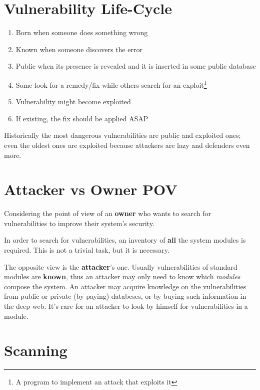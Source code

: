 \section{Vulnerability Life-Cycle}
\begin{enumerate}
    \item Born when someone does something wrong
    \item Known when someone discovers the error
    \item Public when its presence is revealed and it is inserted in some public database
    \item Some look for a remedy/fix while others search for an exploit\footnote{A program to implement an attack that exploits it}
    \item Vulnerability might become exploited
    \item If existing, the fix should be applied ASAP
\end{enumerate}

Historically the most dangerous vulnerabilities are public and exploited ones;
even the oldest ones are exploited because attackers are lazy and defenders even more.

\section{Attacker vs Owner POV}
Considering the point of view of an \textbf{owner} who wants to search for vulnerabilities to improve their system's security.\nl

In order to search for vulnerabilities, an inventory of \textbf{all} the system modules is required.
This is not a trivial task, but it is necessary. 


The opposite view is the \textbf{attacker}'s one.
Usually vulnerabilities of standard modules are \textbf{known}, thus an attacker may only need to know which \textit{modules} compose the system.
An attacker may acquire knowledge on the vulnerabilities from public or private (by paying) databeses,
or by buying such information in the deep web.
It's rare for an attacker to look by himself for vulnerabilities in a module.\nl


\section{Scanning}

